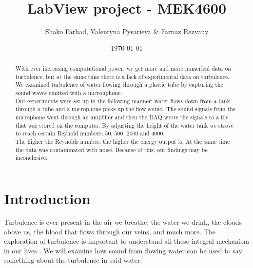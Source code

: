 \documentclass[english,a4paper,12pt]{article}
\title{LabView project - MEK4600}
\author{Shako Farhad, Valentyna Pysarieva \& Farnaz Rezvany}
\date{\today}
\begin{document}
 
 
\lstset{style=mystyle}

\maketitle

\begin{abstract}
With ever increasing computational power, we get more and more numerical data on turbulence, but at the same time there is a lack of experimental data on turbulence. We examined turbulence of water flowing through a plastic tube by capturing the sound waves emitted with a microhphone. \\
Our experiments were set up in the following manner; water flows down from a tank, through a tube and a microphone picks up the flow sound. The sound signals from the microphone went through an amplifier and then the DAQ wrote the signals to a file that was stored on the computer. By adjusting the height of the water tank we strove to reach certain Reynold numbers, $50$, $500$, $2000$ and $4000$. \\
The higher the Reynolds number, the higher the energy output is. At the same time the data was contaminated with noise. Because of this, our findings may be inconclusive.

\end{abstract}

\section*{Introduction}
Turbulence is ever present in the air we breathe, the water we drink, the clouds above us, the blood that flows through our veins, and much more. The exploration of turbulence is important to understand all these integral mechanism in our lives \cite{Turbulence}. We will examine how sound from flowing water can be used to say something about the turbulence in said water.\bigskip
\end{document}
